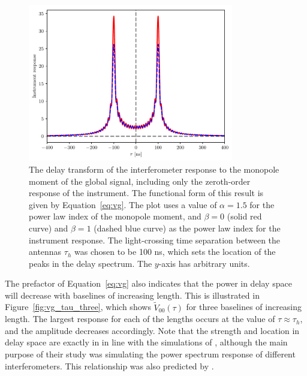 \begin{figure}
\centering
\includegraphics[width=0.8\textwidth]{chapters/global_signal/figures/vg.pdf}
\caption[The delay transform of the interferometer response to the monopole
    moment of the global signal, including only the zeroth-order response of the
    instrument.]{The delay transform of the interferometer response to the monopole
    moment of the global signal, including only the zeroth-order response of the
    instrument. The functional form of this result is given by
    Equation~\ref{eq:vg}. The plot uses a value of $\alpha = 1.5$ for the
    power law index of the monopole moment, and $\beta = 0$ (solid red curve)
    and $\beta = 1$ (dashed blue curve) as the power law index for the
    instrument response. The light-crossing time separation between the antennas
    $\tau_h$ was chosen to be 100 ns, which sets the location of the peaks in
    the delay spectrum. The $y$-axis has arbitrary units.}
\label{fig:vg_tau}
\end{figure}

The prefactor of Equation~\ref{eq:vg} also indicates that the power in delay space will decrease with baselines of increasing length. This is illustrated in Figure~\ref{fig:vg_tau_three}, which shows $\tilde{V}_{00}(\tau)$ for three baselines of increasing length. The largest response for each of the lengths occurs at the value of $\tau\approx\tau_h$, and the amplitude decreases accordingly. Note that the strength and location in delay space are exactly in in line with the simulations of \cite[][see their Figure 2]{Nithya.15b}, although the main purpose of their study was simulating the power spectrum response of different interferometers. This relationship was also predicted by \cite{Venumadhav.16}.

